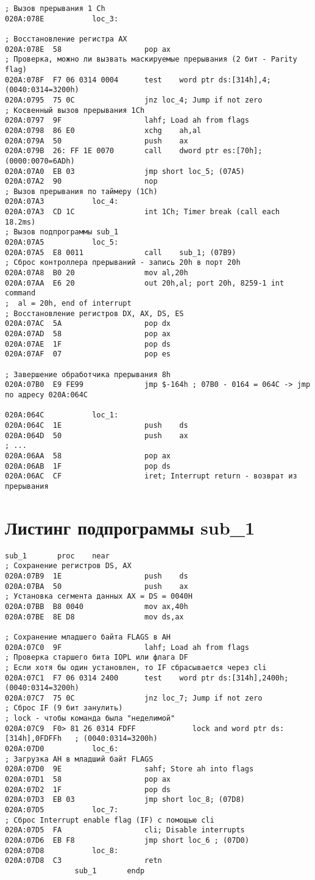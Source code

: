 \begin{lstlisting}[style = {asm}]
; Вызов прерывания 1 Ch
020A:078E			loc_3:

; Восстановление регистра AX
020A:078E  58					pop	ax
; Проверка, можно ли вызвать маскируемые прерывания (2 бит - Parity flag)
020A:078F  F7 06 0314 0004		test	word ptr ds:[314h],4; (0040:0314=3200h)
020A:0795  75 0C				jnz	loc_4; Jump if not zero
; Косвенный вызов прерывания 1Ch
020A:0797  9F					lahf; Load ah from flags
020A:0798  86 E0				xchg	ah,al
020A:079A  50					push	ax
020A:079B  26: FF 1E 0070		call	dword ptr es:[70h]; (0000:0070=6ADh)
020A:07A0  EB 03				jmp	short loc_5; (07A5)
020A:07A2  90					nop
; Вызов прерывания по таймеру (1Ch)
020A:07A3			loc_4:
020A:07A3  CD 1C				int	1Ch; Timer break (call each 18.2ms)
; Вызов подпрограммы sub_1
020A:07A5			loc_5:
020A:07A5  E8 0011				call	sub_1; (07B9)
; Сброс контроллера прерываний - запись 20h в порт 20h
020A:07A8  B0 20				mov	al,20h
020A:07AA  E6 20				out	20h,al; port 20h, 8259-1 int command
;  al = 20h, end of interrupt
; Восстановление регистров DX, AX, DS, ES
020A:07AC  5A					pop	dx
020A:07AD  58					pop	ax
020A:07AE  1F					pop	ds
020A:07AF  07					pop	es

; Завершение обработчика прерывания 8h
020A:07B0  E9 FE99				jmp	$-164h ; 07B0 - 0164 = 064C -> jmp по адресу 020A:064C

020A:064C			loc_1:
020A:064C  1E					push	ds
020A:064D  50					push	ax
; ...
020A:06AA  58					pop	ax
020A:06AB  1F					pop	ds
020A:06AC  CF					iret; Interrupt return - возврат из прерывания
\end{lstlisting}
\newpage

\section{Листинг подпрограммы sub\_1}
\begin{lstlisting}[style={asm}]
sub_1		proc	near
; Сохранение регистров DS, AX
020A:07B9  1E					push	ds
020A:07BA  50					push	ax
; Установка сегмента данных AX = DS = 0040H
020A:07BB  B8 0040				mov	ax,40h
020A:07BE  8E D8				mov	ds,ax

; Сохранение младшего байта FLAGS в AH
020A:07C0  9F					lahf; Load ah from flags
; Проверка старшего бита IOPL или флага DF
; Если хотя бы один установлен, то IF сбрасывается через cli
020A:07C1  F7 06 0314 2400		test	word ptr ds:[314h],2400h; (0040:0314=3200h)
020A:07C7  75 0C				jnz	loc_7; Jump if not zero
; Сброс IF (9 бит занулить)
; lock - чтобы команда была "неделимой"
020A:07C9  F0> 81 26 0314 FDFF	           lock	and	word ptr ds:[314h],0FDFFh	; (0040:0314=3200h)
020A:07D0			loc_6:
; Загрузка AH в младший байт FLAGS
020A:07D0  9E					sahf; Store ah into flags
020A:07D1  58					pop	ax
020A:07D2  1F					pop	ds
020A:07D3  EB 03				jmp	short loc_8; (07D8)
020A:07D5			loc_7:
; Сброс Interrupt enable flag (IF) с помощью cli
020A:07D5  FA					cli; Disable interrupts
020A:07D6  EB F8				jmp	short loc_6	; (07D0)
020A:07D8			loc_8:
020A:07D8  C3					retn
				sub_1		endp
\end{lstlisting}

